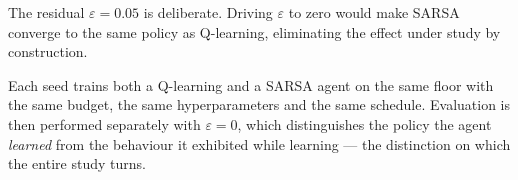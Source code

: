 The residual $\varepsilon = 0.05$ is deliberate. Driving $\varepsilon$ to zero would make SARSA
converge to the same policy as Q-learning, eliminating the effect under study by construction.

Each seed trains both a Q-learning and a SARSA agent on the same floor with the same budget, the
same hyperparameters and the same schedule. Evaluation is then performed separately with
$\varepsilon = 0$, which distinguishes the policy the agent \emph{learned} from the behaviour it
exhibited while learning --- the distinction on which the entire study turns.
